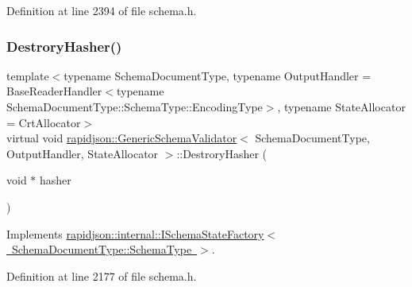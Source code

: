 Definition at line 2394 of file schema.\+h.


\begin{DoxyCode}{0}

\end{DoxyCode}
\mbox{\label{classrapidjson_1_1_generic_schema_validator_af7620c515a7ea2f75ff300cfbf9916cf}} 
\subsubsection{\texorpdfstring{DestroryHasher()}{DestroryHasher()}}
{\footnotesize\ttfamily template$<$typename Schema\+Document\+Type, typename Output\+Handler = Base\+Reader\+Handler$<$typename Schema\+Document\+Type\+::\+Schema\+Type\+::\+Encoding\+Type$>$, typename State\+Allocator = Crt\+Allocator$>$ \\
virtual void \mbox{\hyperlink{classrapidjson_1_1_generic_schema_validator}{rapidjson\+::\+Generic\+Schema\+Validator}}$<$ Schema\+Document\+Type, Output\+Handler, State\+Allocator $>$\+::Destrory\+Hasher (\begin{DoxyParamCaption}\item[{void $\ast$}]{hasher }\end{DoxyParamCaption})\hspace{0.3cm}{\ttfamily [virtual]}}



Implements \mbox{\hyperlink{classrapidjson_1_1internal_1_1_i_schema_state_factory_abda4f78e5673367fd2bc51c1743d8620}{rapidjson\+::internal\+::\+I\+Schema\+State\+Factory$<$ Schema\+Document\+Type\+::\+Schema\+Type $>$}}.



Definition at line 2177 of file schema.\+h.


